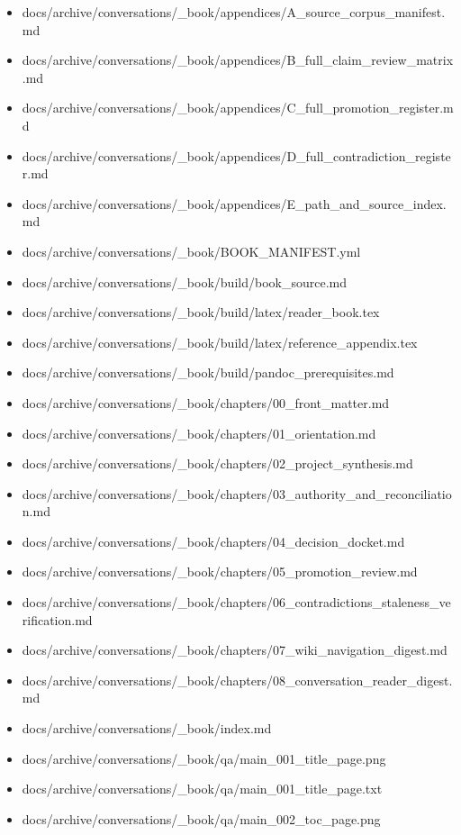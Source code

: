\documentclass[11pt,a4paper]{report}
\begin{document}
\begin{itemize}
\item docs/archive/conversations/\_book/appendices/A\_source\_corpus\_manifest.md
\item docs/archive/conversations/\_book/appendices/B\_full\_claim\_review\_matrix.md
\item docs/archive/conversations/\_book/appendices/C\_full\_promotion\_register.md
\item docs/archive/conversations/\_book/appendices/D\_full\_contradiction\_register.md
\item docs/archive/conversations/\_book/appendices/E\_path\_and\_source\_index.md
\item docs/archive/conversations/\_book/BOOK\_MANIFEST.yml
\item docs/archive/conversations/\_book/build/book\_source.md
\item docs/archive/conversations/\_book/build/latex/reader\_book.tex
\item docs/archive/conversations/\_book/build/latex/reference\_appendix.tex
\item docs/archive/conversations/\_book/build/pandoc\_prerequisites.md
\item docs/archive/conversations/\_book/chapters/00\_front\_matter.md
\item docs/archive/conversations/\_book/chapters/01\_orientation.md
\item docs/archive/conversations/\_book/chapters/02\_project\_synthesis.md
\item docs/archive/conversations/\_book/chapters/03\_authority\_and\_reconciliation.md
\item docs/archive/conversations/\_book/chapters/04\_decision\_docket.md
\item docs/archive/conversations/\_book/chapters/05\_promotion\_review.md
\item docs/archive/conversations/\_book/chapters/06\_contradictions\_staleness\_verification.md
\item docs/archive/conversations/\_book/chapters/07\_wiki\_navigation\_digest.md
\item docs/archive/conversations/\_book/chapters/08\_conversation\_reader\_digest.md
\item docs/archive/conversations/\_book/index.md
\item docs/archive/conversations/\_book/qa/main\_001\_title\_page.png
\item docs/archive/conversations/\_book/qa/main\_001\_title\_page.txt
\item docs/archive/conversations/\_book/qa/main\_002\_toc\_page.png

\end{itemize}
\end{document}
